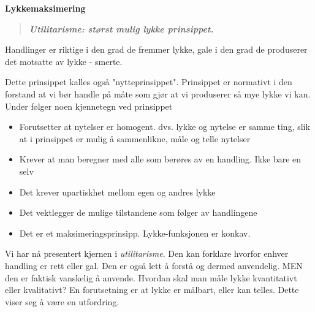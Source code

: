 \documentclass[11pt, a4paper]{article}
\newenvironment{sectionbox}[1][]{%
    \begin{sectionboxinner}
    \textbf{\large #1}
    \vspace{1pt}
    \newline
}{%
    \end{sectionboxinner}
}
\begin{document}
\begin{sectionbox}[Lykkemaksimering]
\begin{flushleft}
    \begin{quote}
        \textbf{\textit{Utilitarisme: størst mulig lykke prinsippet.}}
    \end{quote}
    
    Handlinger er riktige i den grad de fremmer lykke, gale i den grad de produserer det motsatte av lykke - smerte.\newline
    

    Dette prinsippet kalles også "nytteprinsippet". Prinsippet er normativt i den forstand at vi bør handle på måte som gjør at vi produserer så mye lykke vi kan. Under følger noen kjennetegn ved prinsippet

    \begin{itemize}
        \item Forutsetter at nytelser er homogent. dvs. lykke og nytelse er samme ting, slik at i prinsippet er mulig å sammenlikne, måle og telle nytelser
        \item Krever at man beregner med alle som berøres av en handling. Ikke bare en selv
        \item Det krever upartiskhet mellom egen og andres lykke
        \item Det vektlegger de mulige tilstandene som følger av handlingene
        \item Det er et maksimeringsprinsipp. Lykke-funksjonen er konkav.
    \end{itemize}

    Vi har nå presentert kjernen i \textit{utilitarisme}. Den kan forklare hvorfor enhver handling er rett eller gal. Den er også lett å forstå og dermed anvendelig. MEN den er faktisk vanskelig å anvende. Hvordan skal man måle lykke kvantitativt eller kvalitativt? En forutsetning er at lykke er målbart, eller kan telles. Dette viser seg å være en utfordring.
\end{flushleft}
\end{sectionbox}
\end{document}

